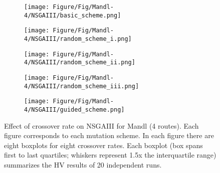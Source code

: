 \begin{figure}[!htbp]
	\centering
	\begin{subfigure}[b]{0.52\textwidth}
		\texttt{[image: Figure/Fig/Mandl-4/NSGAIII/basic\_scheme.png]}
	\end{subfigure}%
	\begin{subfigure}[b]{0.52\textwidth}
		\texttt{[image: Figure/Fig/Mandl-4/NSGAIII/random\_scheme\_i.png]}
	\end{subfigure}%
	\newline
	\begin{subfigure}[b]{0.52\textwidth}
		\texttt{[image: Figure/Fig/Mandl-4/NSGAIII/random\_scheme\_ii.png]}
	\end{subfigure}%
	\begin{subfigure}[b]{0.52\textwidth}
		\texttt{[image: Figure/Fig/Mandl-4/NSGAIII/random\_scheme\_iii.png]}
	\end{subfigure}%
	\newline
	\begin{subfigure}[b]{0.52\textwidth}
		\texttt{[image: Figure/Fig/Mandl-4/NSGAIII/guided\_scheme.png]}
	\end{subfigure}%
	\caption{Effect of crossover rate on NSGAIII for Mandl (4 routes). Each figure corresponds to each mutation scheme. In each figure there are eight boxplots for eight crossover rates.  Each boxplot (box spans first to last quartiles; whiskers represent 1.5x the interquartile range) summarizes the HV results of 20 independent runs.}
	\label{fig:cr_mandl4_nsgaiii}
\end{figure}
